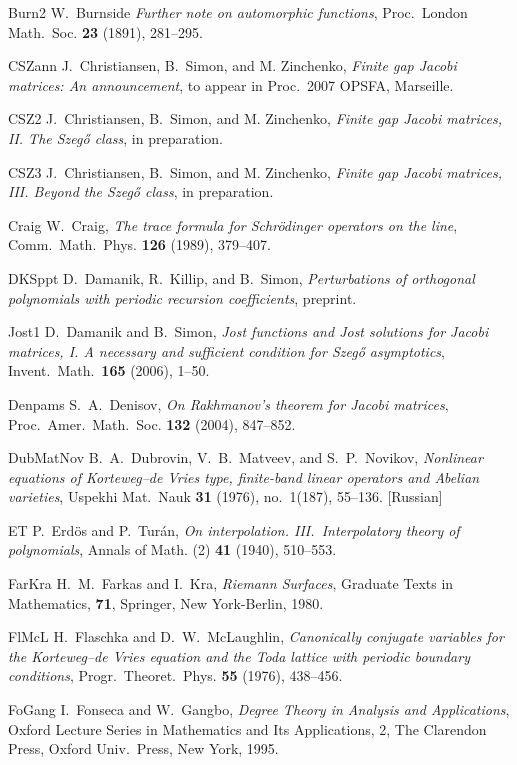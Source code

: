 \documentclass[reqno,centertags, 12pt]{amsart}
\numberwithin{equation}{section}
\theoremstyle{definition}
\begin{document}
\begin{thebibliography}{999}
{\bibitem}{Burn2} W.~Burnside {\it Further note on automorphic functions},
Proc.\ London Math.\ Soc. {\bf 23} (1891), 281--295.

{\bibitem}{CSZann} J.~Christiansen, B.~Simon, and M. Zinchenko, {\it Finite
gap Jacobi matrices: An announcement}, to appear in Proc.\ 2007 OPSFA,
Marseille.

{\bibitem}{CSZ2} J.~Christiansen, B.~Simon, and M. Zinchenko, {\it Finite
gap Jacobi matrices, II. The Szeg\H{o} class}, in preparation.

{\bibitem}{CSZ3} J.~Christiansen, B.~Simon, and M. Zinchenko, {\it Finite
gap Jacobi matrices, III. Beyond the Szeg\H{o} class}, in
preparation.

{\bibitem}{Craig} W.~Craig, {\it The trace formula for Schr\"odinger
operators on the line}, Comm.\ Math.\ Phys. {\bf 126} (1989),
379--407.

{\bibitem}{DKSppt} D.~Damanik, R.~Killip, and B.~Simon, {\it Perturbations
of orthogonal polynomials with periodic recursion coefficients},
preprint.

{\bibitem}{Jost1} D.~Damanik and B.~Simon, {\it Jost functions and Jost
solutions for Jacobi matrices, I. A necessary and sufficient
condition for Szeg\H{o} asymptotics}, Invent.\ Math.\ {\bf 165}
(2006), 1--50.

{\bibitem}{Denpams} S.~A.~Denisov, \emph{On Rakhmanov's theorem for Jacobi
matrices}, Proc.\ Amer.\ Math.\ Soc. \textbf{132} (2004), 847--852.

{\bibitem}{DubMatNov} B.~A.~Dubrovin, V.~B.~Matveev, and S.~P.~Novikov,
{\it Nonlinear equations of Korteweg--de Vries type, finite-band
linear operators and Abelian varieties}, Uspekhi Mat.\ Nauk {\bf 31}
(1976), no.\ 1(187), 55--136. [Russian]

{\bibitem}{ET} P.~Erd\"os and P.~Tur\'an, {\it On interpolation. III.\
Interpolatory theory of polynomials}, Annals of Math. (2) {\bf 41}
(1940), 510--553.

{\bibitem}{FarKra} H.~M.~Farkas and I.~Kra, \textit{Riemann Surfaces},
Graduate Texts in Mathematics, {\bf 71}, Springer, New York-Berlin, 1980.

{\bibitem}{FlMcL} H.~Flaschka and D.~W.~McLaughlin, {\it Canonically
conjugate variables for the Korteweg--de Vries equation and the Toda
lattice with periodic boundary conditions}, Progr.\ Theoret.\ Phys.
{\bf 55} (1976),  438--456.

{\bibitem}{FoGang} I.~Fonseca and W.~Gangbo, \textit{Degree Theory in
Analysis and Applications}, Oxford Lecture Series in Mathematics and
Its Applications, 2, The Clarendon Press, Oxford Univ.\ Press, New
York, 1995.


\end{thebibliography}
\end{document}
